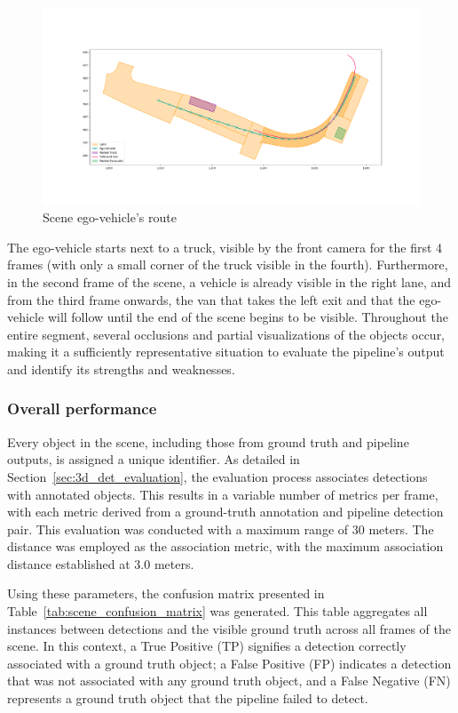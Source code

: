 \begin{figure}[!ht]
    \centering
    \includegraphics[width=\linewidth]{./images/experiments/ground_truth_scene.png}
    \caption{Scene ego-vehicle's route}
    \label{fig:scene_ego_path}
\end{figure}

The ego-vehicle starts next to a truck, visible by the front camera for the first 4 frames (with only a small corner of the truck visible in the fourth). Furthermore, in the second frame of the scene, a vehicle is already visible in the right lane, and from the third frame onwards, the van that takes the left exit and that the ego-vehicle will follow until the end of the scene begins to be visible. Throughout the entire segment, several occlusions and partial visualizations of the objects occur, making it a sufficiently representative situation to evaluate the pipeline's output and identify its strengths and weaknesses.


\subsubsection{Overall performance}
Every object in the scene, including those from ground truth and pipeline outputs, is assigned a unique identifier. As detailed in Section~\ref{sec:3d_det_evaluation}, the evaluation process associates detections with annotated objects. This results in a variable number of metrics per frame, with each metric derived from a ground-truth annotation and pipeline detection pair. This evaluation was conducted with a  maximum range of $30$ meters. The  distance was employed as the association metric, with the maximum association distance established at $3.0$ meters.

Using these parameters, the confusion matrix presented in Table~\ref{tab:scene_confusion_matrix} was generated. This table aggregates all instances between detections and the visible ground truth across all frames of the scene. In this context, a True Positive (TP) signifies a detection correctly associated with a ground truth object; a False Positive (FP) indicates a detection that was not associated with any ground truth object, and a False Negative (FN) represents a ground truth object that the pipeline failed to detect.


